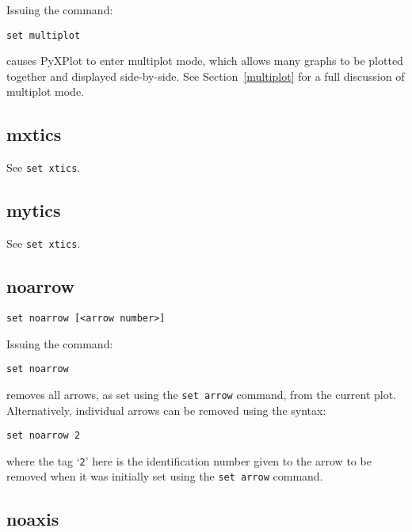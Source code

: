 \documentclass[a4paper,onecolumn,11pt]{book}
\begin{document}
Issuing the command:

\begin{verbatim}
set multiplot
\end{verbatim}

\noindent causes PyXPlot to enter multiplot mode, which allows many graphs to
be plotted together and displayed side-by-side. See Section~\ref{multiplot} for
a full discussion of multiplot mode.


\subsection{mxtics}

See {\tt set xtics}.
   

\subsection{mytics}

See {\tt set xtics}.
   

\subsection{noarrow}

\begin{verbatim}
set noarrow [<arrow number>]
\end{verbatim}

Issuing the command:

\begin{verbatim}
set noarrow
\end{verbatim}

\noindent removes all arrows, as set using the {\tt set arrow} command, from the current
plot. Alternatively, individual arrows can be removed using the syntax:

\begin{verbatim}
set noarrow 2
\end{verbatim}

where the tag `{\tt 2}' here is the identification number given to the arrow to be
removed when it was initially set using the {\tt set arrow} command.


\subsection{noaxis}
\end{document}
